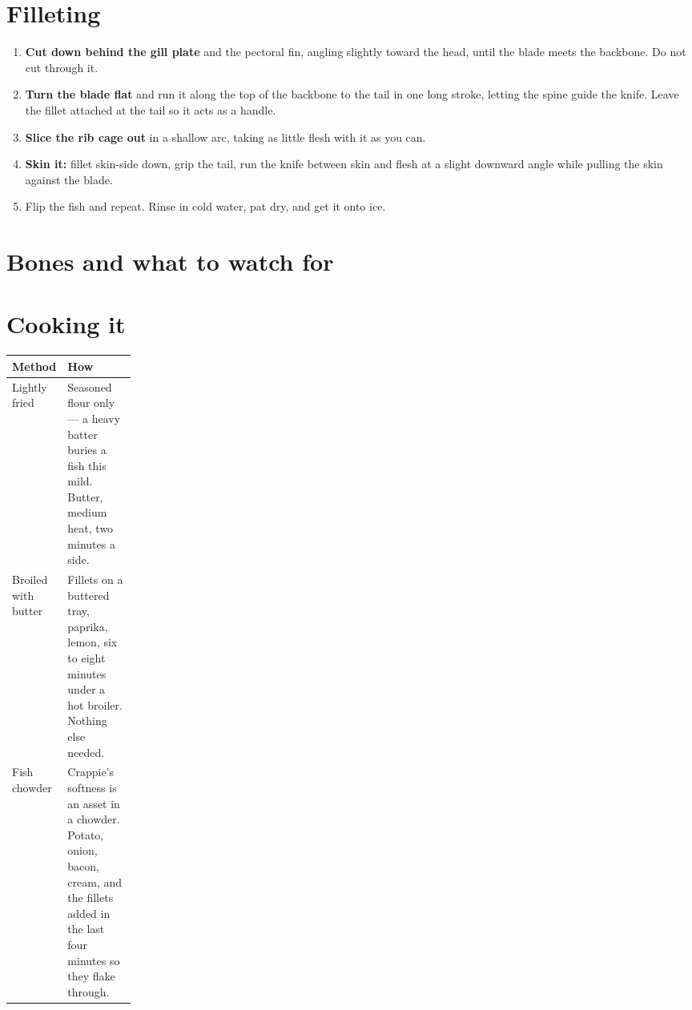 \section{Filleting}
\begin{enumerate}
\item \textbf{Cut down behind the gill plate} and the pectoral fin, angling slightly toward the head, until the blade meets the backbone. Do not cut through it.
\item \textbf{Turn the blade flat} and run it along the top of the backbone to the tail in one long stroke, letting the spine guide the knife. Leave the fillet attached at the tail so it acts as a handle.
\item \textbf{Slice the rib cage out} in a shallow arc, taking as little flesh with it as you can.
\item \textbf{Skin it:} fillet skin-side down, grip the tail, run the knife between skin and flesh at a slight downward angle while pulling the skin against the blade.
\item Flip the fish and repeat. Rinse in cold water, pat dry, and get it onto ice.
\end{enumerate}

\section{Bones and what to watch for}
\begin{telosfacts}[0.20]
\end{telosfacts}

\section{Cooking it}
\begin{tabularx}{\linewidth}{@{}p{0.18\linewidth}L@{}}
\toprule
\textbf{Method} & \textbf{How}\\
\midrule
Lightly fried & Seasoned flour only --- a heavy batter buries a fish this mild. Butter, medium heat, two minutes a side.\\
Broiled with butter & Fillets on a buttered tray, paprika, lemon, six to eight minutes under a hot broiler. Nothing else needed.\\
Fish chowder & Crappie's softness is an asset in a chowder. Potato, onion, bacon, cream, and the fillets added in the last four minutes so they flake through.\\
\bottomrule
\end{tabularx}

